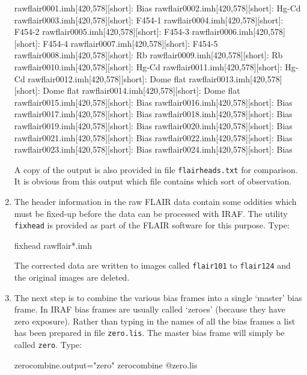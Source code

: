 \documentclass[twoside,11pt]{starlink}
\begin{document}
\begin{enumerate}
\begin{small}
\begin{terminalv}
rawflair0001.imh[420,578][short]: Bias
rawflair0002.imh[420,578][short]: Hg-Cd
rawflair0003.imh[420,578][short]: F454-1
rawflair0004.imh[420,578][short]: F454-2
rawflair0005.imh[420,578][short]: F454-3
rawflair0006.imh[420,578][short]: F454-4
rawflair0007.imh[420,578][short]: F454-5
rawflair0008.imh[420,578][short]: Rb
rawflair0009.imh[420,578][short]: Rb
rawflair0010.imh[420,578][short]: Hg-Cd
rawflair0011.imh[420,578][short]: Hg-Cd
rawflair0012.imh[420,578][short]: Dome flat
rawflair0013.imh[420,578][short]: Dome flat
rawflair0014.imh[420,578][short]: Dome flat
rawflair0015.imh[420,578][short]: Bias
rawflair0016.imh[420,578][short]: Bias
rawflair0017.imh[420,578][short]: Bias
rawflair0018.imh[420,578][short]: Bias
rawflair0019.imh[420,578][short]: Bias
rawflair0020.imh[420,578][short]: Bias
rawflair0021.imh[420,578][short]: Bias
rawflair0022.imh[420,578][short]: Bias
rawflair0023.imh[420,578][short]: Bias
rawflair0024.imh[420,578][short]: Bias
\end{terminalv}
\end{small}

   A copy of the output is also provided in file \texttt{flairheads.txt} for comparison.  It is obvious from this
   output which file contains which sort of observation.

  \item The header information in the raw FLAIR data contain some oddities
   which must be fixed-up before the data can be processed with IRAF.  The
   utility \texttt{fixhead} is provided as part of the FLAIR software for
   this purpose.  Type:

\begin{terminalv}
fixhead  rawflair*.imh
\end{terminalv}

   The corrected data are written to images called \texttt{flair101}
   to \texttt{flair124} and the original images are deleted.

  \item The next step is to combine the various bias frames into
   a single `master' bias frame.  In IRAF bias frames are usually
   called `zeroes' (because they have zero exposure).  Rather
   than typing in the names of all the bias frames a list has
   been prepared in file \texttt{zero.lis}.  The master bias frame
   will simply be called \texttt{zero}.  Type:

\begin{terminalv}
zerocombine.output="zero"
zerocombine  @zero.lis
\end{terminalv}


\end{enumerate}
\end{document}
